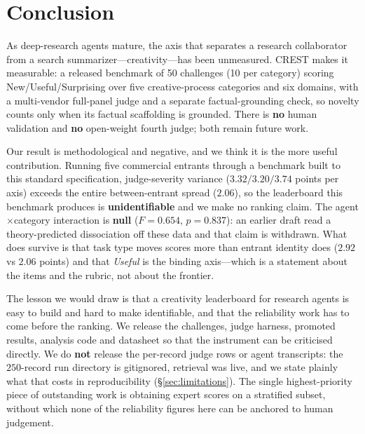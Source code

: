 \section{Conclusion}
As deep-research agents mature, the axis that separates a research collaborator from a search
summarizer---creativity---has been unmeasured. \textsc{CREST} makes it measurable: a released
benchmark of 50 challenges (10 per category) scoring New/Useful/Surprising over five
creative-process categories and six domains, with a multi-vendor full-panel judge and a separate
factual-grounding check, so novelty counts only when its factual scaffolding is grounded. There is
\textbf{no} human validation and \textbf{no} open-weight fourth judge; both remain future work.

Our result is methodological and negative, and we think it is the more useful contribution. Running
five commercial entrants through a benchmark built to this standard specification, judge-severity
variance ($3.32/3.20/3.74$ points per axis) exceeds the entire between-entrant spread ($2.06$), so
the leaderboard this benchmark produces is \textbf{unidentifiable} and we make no ranking claim. The
agent$\times$category interaction is \textbf{null} ($F=0.654$, $p=0.837$): an earlier draft read a
theory-predicted dissociation off these data and that claim is withdrawn. What does survive is that
task type moves scores more than entrant identity does ($2.92$ vs $2.06$ points) and that
\emph{Useful} is the binding axis---which is a statement about the items and the rubric, not about
the frontier.

The lesson we would draw is that a creativity leaderboard for research agents is easy to build and
hard to make identifiable, and that the reliability work has to come before the ranking. We release
the challenges, judge harness, promoted results, analysis code and datasheet so that the instrument
can be criticised directly. We do \textbf{not} release the per-record judge rows or agent
transcripts: the $250$-record run directory is gitignored, retrieval was live, and we state plainly
what that costs in reproducibility (\S\ref{sec:limitations}). The single highest-priority piece of
outstanding work is obtaining expert scores on a stratified subset, without which none of the
reliability figures here can be anchored to human judgement.
